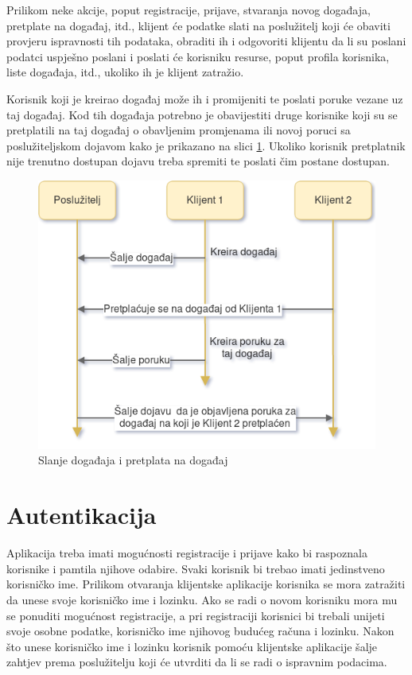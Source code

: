 \documentclass[times, utf8, zavrsni]{fer}
\begin{document}
Prilikom neke akcije, poput registracije, prijave, stvaranja novog događaja, pretplate na događaj, itd., klijent će podatke slati na poslužitelj koji će obaviti provjeru ispravnosti tih podataka, obraditi ih i odgovoriti klijentu da li su poslani podatci uspješno poslani i poslati će korisniku resurse, poput profila korisnika, liste događaja, itd., ukoliko ih je klijent zatražio.

Korisnik koji je kreirao događaj može ih i promijeniti te poslati poruke vezane uz taj događaj. Kod tih događaja potrebno je obavijestiti druge korisnike koji su se pretplatili na taj događaj o obavljenim promjenama ili novoj poruci sa poslužiteljskom dojavom kako je prikazano na slici \ref{fig:event-subscription-image}. Ukoliko korisnik pretplatnik nije trenutno dostupan dojavu treba spremiti te poslati čim postane dostupan.

\begin{figure}[htb]
\centering
\includegraphics[width=14cm]{img/event-subscription.png}
\caption{Slanje događaja i pretplata na događaj}
\label{fig:event-subscription-image}
\end{figure}

\section{Autentikacija}
Aplikacija treba imati mogućnosti registracije i prijave kako bi raspoznala korisnike i pamtila njihove odabire. Svaki korisnik bi trebao imati jedinstveno korisničko ime. Prilikom otvaranja klijentske aplikacije korisnika se mora zatražiti da unese svoje korisničko ime i lozinku. Ako se radi o novom korisniku mora mu se ponuditi mogućnost registracije, a pri registraciji korisnici bi trebali unijeti svoje osobne podatke, korisničko ime njihovog budućeg računa i lozinku. Nakon što unese korisničko ime i lozinku korisnik pomoću klijentske aplikacije šalje zahtjev prema poslužitelju koji će utvrditi da li se radi o ispravnim podacima. 
\end{document}
